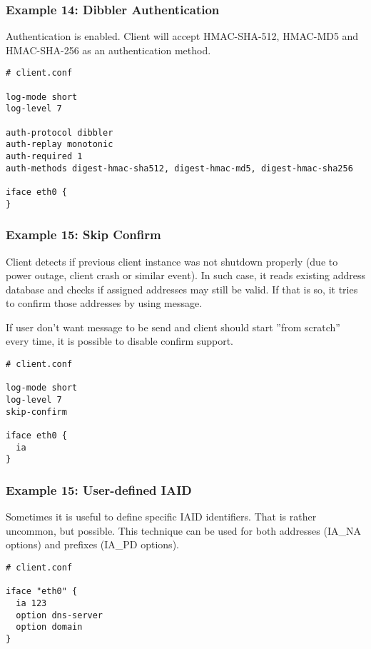 \subsubsection{Example 14: Dibbler Authentication}
\label{example-client-auth}
Authentication is enabled. Client will accept HMAC-SHA-512, HMAC-MD5
and HMAC-SHA-256 as an authentication method.

\begin{lstlisting}
# client.conf

log-mode short
log-level 7

auth-protocol dibbler
auth-replay monotonic
auth-required 1
auth-methods digest-hmac-sha512, digest-hmac-md5, digest-hmac-sha256

iface eth0 {
}
\end{lstlisting}

\subsubsection{Example 15: Skip Confirm}
\label{example-client-confirm}
Client detects if previous client instance was not shutdown properly
(due to power outage, client crash or similar event). In such case, it
reads existing address database and checks if assigned addresses may
still be valid. If that is so, it tries to confirm those addresses by
using  message.

If user don't want  message to be send and client should
start ''from scratch'' every time, it is possible to disable confirm
support.

\begin{lstlisting}
# client.conf

log-mode short
log-level 7
skip-confirm

iface eth0 {
  ia
}
\end{lstlisting}

\subsubsection{Example 15: User-defined IAID}
\label{example-client-iaid}
Sometimes it is useful to define specific IAID  identifiers. That is
rather uncommon, but possible. This technique can be used for both
addresses (IA\_NA options) and prefixes (IA\_PD options).

\begin{lstlisting}
# client.conf

iface "eth0" {
  ia 123
  option dns-server
  option domain
}
\end{lstlisting}

